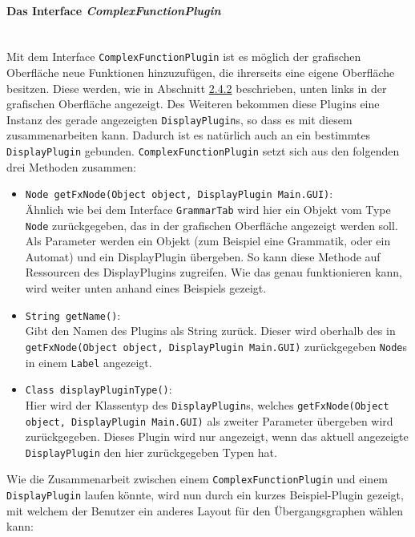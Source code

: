 \paragraph{Das Interface \textit{ComplexFunctionPlugin}}\ \\
Mit dem Interface \lstinline[columns=fixed]{ComplexFunctionPlugin} ist es möglich der grafischen Oberfläche neue Funktionen hinzuzufügen, die ihrerseits eine eigene Oberfläche besitzen. Diese werden, wie in Abschnitt \hyperref[sec:2.4.2]{2.4.2} beschrieben, unten links in der grafischen Oberfläche angezeigt. Des Weiteren bekommen diese Plugins eine Instanz des gerade angezeigten \lstinline[columns=fixed]{DisplayPlugin}s, so dass es mit diesem zusammenarbeiten kann. Dadurch ist es natürlich auch an ein bestimmtes \lstinline[columns=fixed]{DisplayPlugin} gebunden. \lstinline[columns=fixed]{ComplexFunctionPlugin} setzt sich aus den folgenden drei Methoden zusammen:
\begin{itemize}
	\item \lstinline[columns=fixed]{Node getFxNode(Object object, DisplayPlugin Main.GUI)}:\\
	Ähnlich wie bei dem Interface \lstinline[columns=fixed]{GrammarTab} wird hier ein Objekt vom Type \lstinline[columns=fixed]{Node} zurückgegeben, das in der grafischen Oberfläche angezeigt werden soll. Als Parameter werden ein Objekt (zum Beispiel eine Grammatik, oder ein Automat) und ein DisplayPlugin übergeben. So kann diese Methode auf Ressourcen des DisplayPlugins zugreifen. Wie das genau funktionieren kann, wird weiter unten anhand eines Beispiels gezeigt.
	\item \lstinline[columns=fixed]{String getName()}:\\
	Gibt den Namen des Plugins als String zurück. Dieser wird oberhalb des in \lstinline[columns=fixed]{getFxNode(Object object, DisplayPlugin Main.GUI)} zurückgegeben \lstinline[columns=fixed]{Node}s in einem \lstinline[columns=fixed]{Label} angezeigt.
	\item \lstinline[columns=fixed]{Class displayPluginType()}:\\
	Hier wird der Klassentyp des \lstinline[columns=fixed]{DisplayPlugin}s, welches \lstinline[columns=fixed]{getFxNode(Object object, DisplayPlugin Main.GUI)} als zweiter Parameter übergeben wird zurückgegeben. Dieses Plugin wird nur angezeigt, wenn das aktuell angezeigte \lstinline[columns=fixed]{DisplayPlugin} den hier zurückgegeben Typen hat.
\end{itemize}
Wie die Zusammenarbeit zwischen einem \lstinline[columns=fixed]{ComplexFunctionPlugin} und einem \lstinline[columns=fixed]{DisplayPlugin} laufen könnte, wird nun durch ein kurzes Beispiel-Plugin gezeigt, mit welchem der Benutzer ein anderes Layout für den Übergangsgraphen wählen kann:
